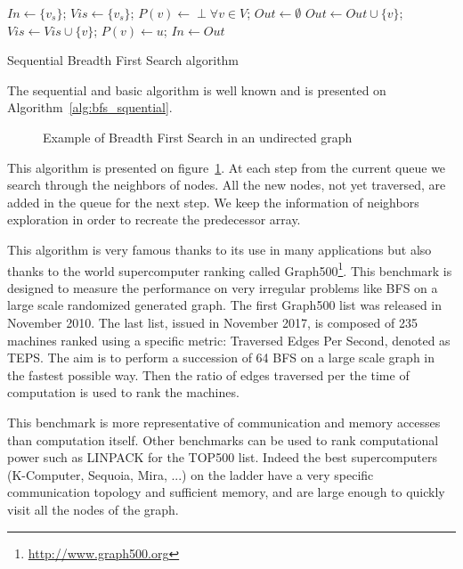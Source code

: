 \begin{algorithm}

\begin{algorithmic}[1]
\State $In \gets \{v_s\}$;
\State $Vis \gets \{v_s\}$;
\State $P(v) \gets \perp \forall v \in V$;
	\State $Out \gets \emptyset$
				\State $Out \leftarrow Out \cup \{v\}$;
				\State $Vis \gets Vis \cup \{v\}$;
				\State $P(v) \leftarrow u$;
			\EndIf
		\EndFor
	\EndFor
	\State $In \gets Out$
\EndWhile
\EndFunction
\end{algorithmic}
\caption{Sequential Breadth First Search algorithm}
\label{alg:bfs_squential}
\end{algorithm}

The sequential and basic algorithm is well known and is presented on Algorithm~\ref{alg:bfs_squential}.

\begin{figure}
\centering

\caption{Example of Breadth First Search in an undirected graph}
\label{fig:part2_chap3:BFS}
\end{figure}


This algorithm is presented on figure~\ref{fig:part2_chap3:BFS}.
At each step from the current queue we search through the neighbors of nodes. 
All the new nodes, not yet traversed, are added in the queue for the next step.
We keep the information of neighbors exploration in order to recreate the predecessor array. 

This algorithm is very famous thanks to its use in many applications but also thanks to the world supercomputer ranking called Graph500\footnote{\url{http://www.graph500.org}}.
This benchmark is designed to measure the performance on very irregular problems like BFS on a large scale randomized generated graph. 
The first Graph500 list was released in November 2010.
The last list, issued in November 2017, is composed of 235 machines ranked using a specific metric: Traversed Edges Per Second, denoted as TEPS. 
The aim is to perform a succession of 64 BFS on a large scale graph in the fastest possible way.
Then the ratio of edges traversed per the time of computation is used to rank the machines.

This benchmark is more representative of communication and memory accesses than computation itself. 
Other benchmarks can be used to rank computational power such as LINPACK for the TOP500 list.
Indeed the best supercomputers (K-Computer, Sequoia, Mira, ...) on the ladder have a very specific communication topology and sufficient memory, and are large enough to quickly visit all the nodes of the graph. 

